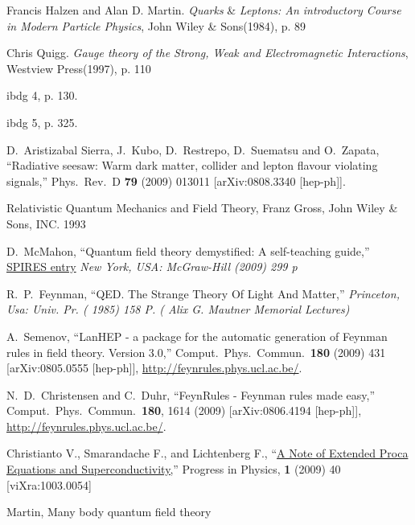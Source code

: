 \begin{thebibliography}{99}
Francis Halzen and Alan D. Martin. \emph{Quarks} \& \emph{Leptons:
An introductory Course in Modern Particle Physics}, John Wiley \&
Sons(1984), p. 89

Chris Quigg. \emph{Gauge theory of the Strong, Weak and
Electromagnetic Interactions}, Westview Press(1997), p. 110


ibdg 4, p. 130.

ibdg 5, p. 325.


  D.~Aristizabal Sierra, J.~Kubo, D.~Restrepo, D.~Suematsu and O.~Zapata,
  ``Radiative seesaw: Warm dark matter, collider and lepton flavour violating
  signals,''
  Phys.\ Rev.\  D {\bf 79} (2009) 013011
  [arXiv:0808.3340 [hep-ph]].

Relativistic Quantum Mechanics and Field Theory, Franz Gross, John Wiley \& Sons, INC. 1993

  D.~McMahon,
  ``Quantum field theory demystified: A self-teaching guide,''
  \href{http://www.slac.stanford.edu/spires/find/hep/www?irn=8432112}{SPIRES entry}
{\it  New York, USA: McGraw-Hill (2009) 299 p}

  R.~P.~Feynman,
  ``QED. The Strange Theory Of Light And Matter,''
{\it  Princeton, Usa: Univ. Pr. ( 1985) 158 P. ( Alix G. Mautner Memorial Lectures)}


  A.~Semenov,
  ``LanHEP - a package for the automatic generation of Feynman rules in field
  theory. Version 3.0,''
  Comput.\ Phys.\ Commun.\  {\bf 180} (2009) 431
  [arXiv:0805.0555 [hep-ph]], \url{http://feynrules.phys.ucl.ac.be/}.

  N.~D.~Christensen and C.~Duhr,
  ``FeynRules - Feynman rules made easy,''
  Comput.\ Phys.\ Commun.\  {\bf 180}, 1614 (2009)
  [arXiv:0806.4194 [hep-ph]],
   \url{http://feynrules.phys.ucl.ac.be/}.

  Christianto V., Smarandache F., and Lichtenberg F., 
  ``\href{http://www.ptep-online.com/index_files/2009/PP-16-08.PDF}{A Note of Extended Proca Equations and Superconductivity,}''
  Progress in Physics, \textbf{1} (2009) 40
  [viXra:1003.0054]

Martin, Many body quantum field theory


\end{thebibliography}
